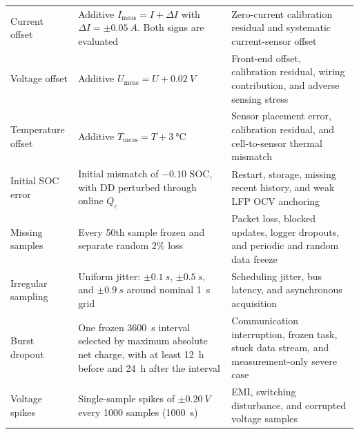 \documentclass[review,nopreprintline]{elsarticle}
\begin{document}
\begin{longtable}{@{}>{\raggedright\arraybackslash}p{1.90cm}>{\raggedright\arraybackslash}p{3.50cm}>{\raggedright\arraybackslash}p{5.55cm}@{}}
    \addlinespace[2pt]
    Current offset & Additive $I_{\mathrm{meas}}=I+\Delta I$ with $\Delta I=\pm\SI{0.05}{A}$. Both signs are evaluated & Zero-current calibration residual and systematic current-sensor offset \cite{DesignConsiderationsCurrent,TMCS11083Functional,TLE4972HighPrecision} \\
    \addlinespace[2pt]
    Voltage offset & Additive $U_{\mathrm{meas}}=U+\SI{0.02}{V}$ & Front-end offset, calibration residual, wiring contribution, and adverse sensing stress \\
    \addlinespace[2pt]
    Temperature offset & Additive $T_{\mathrm{meas}}=T+\SI{3}{\celsius}$ & Sensor placement error, calibration residual, and cell-to-sensor thermal mismatch \\
    \addlinespace[2pt]
    Initial SOC error & Initial mismatch of $-0.10$ SOC, with DD perturbed through online $Q_c$ & Restart, storage, missing recent history, and weak LFP OCV anchoring \cite{liRobustnessSOCEstimation2015,gaoEnhancedStateofchargeEstimation2022} \\
    \addlinespace[3.5pt]
    Missing samples & Every 50th sample frozen and separate random $2\%$ loss & Packet loss, blocked updates, logger dropouts, and periodic and random data freeze \cite{naseriReliableWirelessBMS2025,liuAssessingImpactSampling2025} \\
    \addlinespace[3.5pt]
    Irregular sampling & Uniform jitter: $\pm\SI{0.1}{s}$, $\pm\SI{0.5}{s}$, and $\pm\SI{0.9}{s}$ around nominal \SI{1}{s} grid & Scheduling jitter, bus latency, and asynchronous acquisition \cite{bergerBenchmarkingBatteryManagement2024,naseriReliableWirelessBMS2025,liuAssessingImpactSampling2025} \\
    \addlinespace[2pt]
    Burst dropout & One frozen \SI{3600}{s} interval selected by maximum absolute net charge, with at least 12~h before and 24~h after the interval & Communication interruption, frozen task, stuck data stream, and measurement-only severe case \cite{bergerBenchmarkingBatteryManagement2024,naseriReliableWirelessBMS2025} \\
    \addlinespace[2pt]
    Voltage spikes & Single-sample spikes of $\pm\SI{0.20}{V}$ every 1000 samples (\SI{1000}{s}) & EMI, switching disturbance, and corrupted voltage samples \cite{aielloElectromagneticSusceptibilityBattery2020} \\
\end{longtable}
\endgroup
\end{document}
